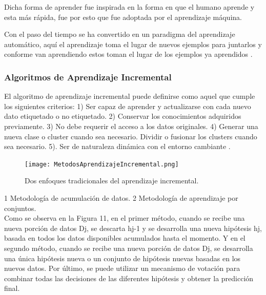         Dicha forma de aprender fue inspirada en la forma en que el humano aprende y esta más rápida, fue por esto que fue adoptada 
        por el aprendizaje m\'aquina.

        Con el paso del tiempo se ha convertido en un paradigma del aprendizaje automático, aquí el aprendizaje toma el lugar de nuevos ejemplos para juntarlos 
        y conforme van aprendiendo estos toman el lugar de los ejemplos ya aprendidos \cite{liu2015}.

        \subsubsection{Algoritmos de Aprendizaje Incremental}
        	
        	
        El algoritmo de aprendizaje incremental puede definirse como aquel que cumple los siguientes criterios:  
        1) Ser capaz de aprender y actualizarse con cada nuevo dato etiquetado o no etiquetado. 
        2) Conservar los conocimientos adquiridos previamente.
        3) No debe requerir el acceso a los datos originales. 
        4) Generar una nueva clase o cluster cuando sea necesario. Dividir o fusionar los clusters cuando sea necesario. 
        5). Ser de naturaleza dinámica con el entorno cambiante \cite{Deshmukh2013}.
        
        \begin{figure}[H]
        	\centering
        	\texttt{[image: MetodosAprendizajeIncremental.png]}
            \caption{Dos enfoques tradicionales del aprendizaje incremental.}
            \label{fig:fig11}
        \end{figure} 
        1 Metodología de acumulación de datos. 2 Metodología de aprendizaje por conjuntos.\\
        
		Como se observa en la Figura 11, en el primer método, cuando se recibe una nueva porción de datos Dj, se descarta hj-1 y se desarrolla una nueva hipótesis hj, basada en todos los datos disponibles acumulados hasta el momento. 
		Y en el segundo método, cuando se recibe una nueva porción de datos Dj, se desarrolla una única hipótesis nueva o un conjunto de hipótesis nuevas basadas en los nuevos datos. 
		Por último, se puede utilizar un mecanismo de votación para combinar todas las decisiones de las diferentes hipótesis y obtener la predicción final.\\
		
